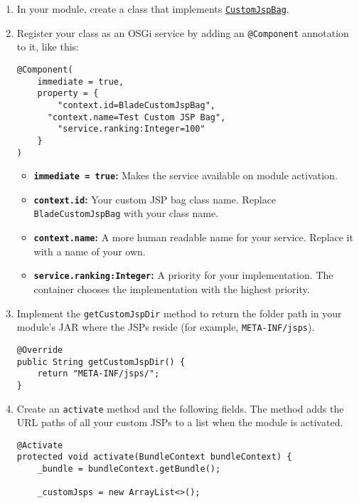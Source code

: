 \begin{enumerate}
\def\labelenumi{\arabic{enumi}.}
\item
  In your module, create a class that implements
  \href{https://docs.liferay.com/dxp/portal/7.2-latest/javadocs/portal-impl/com/liferay/portal/deploy/hot/CustomJspBag.html}{\texttt{CustomJspBag}}.
\item
  Register your class as an OSGi service by adding an
  \texttt{@Component} annotation to it, like this:

\begin{verbatim}
@Component(
    immediate = true,
    property = {
        "context.id=BladeCustomJspBag",
      "context.name=Test Custom JSP Bag",
        "service.ranking:Integer=100"
    }
)
\end{verbatim}

  \begin{itemize}
  \tightlist
  \item
    \textbf{\texttt{immediate\ =\ true}:} Makes the service available on
    module activation.
  \item
    \textbf{\texttt{context.id}:} Your custom JSP bag class name.
    Replace \texttt{BladeCustomJspBag} with your class name.
  \item
    \textbf{\texttt{context.name}:} A more human readable name for your
    service. Replace it with a name of your own.
  \item
    \textbf{\texttt{service.ranking:Integer}:} A priority for your
    implementation. The container chooses the implementation with the
    highest priority.
  \end{itemize}
\item
  Implement the \texttt{getCustomJspDir} method to return the folder
  path in your module's JAR where the JSPs reside (for example,
  \texttt{META-INF/jsps}).

\begin{verbatim}
@Override
public String getCustomJspDir() {
    return "META-INF/jsps/";
}
\end{verbatim}
\item
  Create an \texttt{activate} method and the following fields. The
  method adds the URL paths of all your custom JSPs to a list when the
  module is activated.

\begin{verbatim}
@Activate
protected void activate(BundleContext bundleContext) {
    _bundle = bundleContext.getBundle();

    _customJsps = new ArrayList<>();


\end{verbatim}
\end{enumerate}
